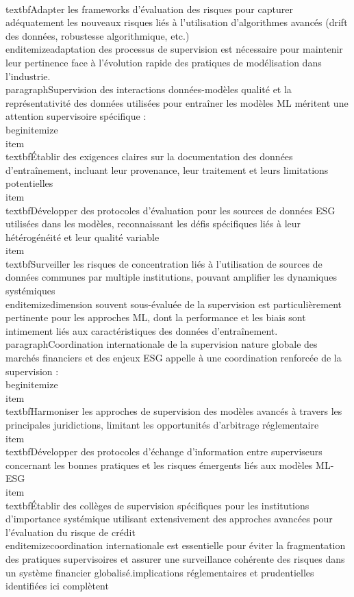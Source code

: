 \\textbf{Adapter les frameworks d'évaluation des risques} pour capturer adéquatement les nouveaux risques liés à l'utilisation d'algorithmes avancés (drift des données, robustesse algorithmique, etc.)\n\\end{itemize}\n\nCette adaptation des processus de supervision est nécessaire pour maintenir leur pertinence face à l'évolution rapide des pratiques de modélisation dans l'industrie.\n\n\\paragraph{Supervision des interactions données-modèles} \n\nLa qualité et la représentativité des données utilisées pour entraîner les modèles ML méritent une attention supervisoire spécifique :\n\n\\begin{itemize}\n    \\item \\textbf{Établir des exigences claires sur la documentation des données} d'entraînement, incluant leur provenance, leur traitement et leurs limitations potentielles\n    \n    \\item \\textbf{Développer des protocoles d'évaluation pour les sources de données ESG} utilisées dans les modèles, reconnaissant les défis spécifiques liés à leur hétérogénéité et leur qualité variable\n    \n    \\item \\textbf{Surveiller les risques de concentration} liés à l'utilisation de sources de données communes par multiple institutions, pouvant amplifier les dynamiques systémiques\n\\end{itemize}\n\nCette dimension souvent sous-évaluée de la supervision est particulièrement pertinente pour les approches ML, dont la performance et les biais sont intimement liés aux caractéristiques des données d'entraînement.\n\n\\paragraph{Coordination internationale de la supervision} \n\nLa nature globale des marchés financiers et des enjeux ESG appelle à une coordination renforcée de la supervision :\n\n\\begin{itemize}\n    \\item \\textbf{Harmoniser les approches de supervision des modèles avancés} à travers les principales juridictions, limitant les opportunités d'arbitrage réglementaire\n    \n    \\item \\textbf{Développer des protocoles d'échange d'information} entre superviseurs concernant les bonnes pratiques et les risques émergents liés aux modèles ML-ESG\n    \n    \\item \\textbf{Établir des collèges de supervision spécifiques} pour les institutions d'importance systémique utilisant extensivement des approches avancées pour l'évaluation du risque de crédit\n\\end{itemize}\n\nCette coordination internationale est essentielle pour éviter la fragmentation des pratiques supervisoires et assurer une surveillance cohérente des risques dans un système financier globalisé.\n\nLes implications réglementaires et prudentielles identifiées ici complètent 